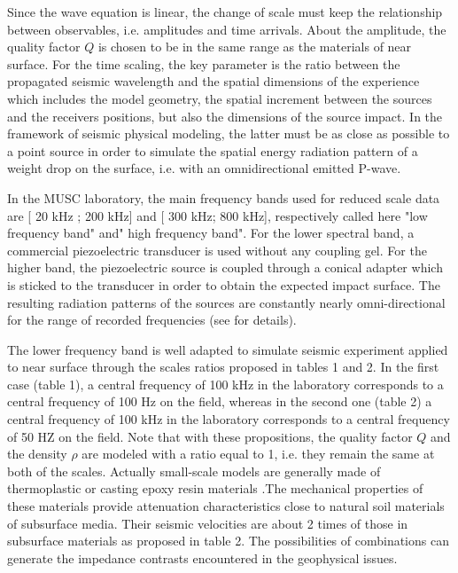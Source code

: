 \documentclass[manuscript,revised]{geophysics}
\begin{document}
\noindent Since the wave equation is linear, the change of scale must keep the relationship between observables, i.e. amplitudes and time arrivals. About the amplitude, the quality factor $Q$ is chosen to be in the same range as the materials of near surface. For the time scaling, the key parameter is the ratio between the propagated seismic wavelength and the spatial dimensions of the experience which includes the model geometry, the spatial increment between the sources and the receivers positions, but also the dimensions of the source impact. In the framework of seismic physical modeling, the latter must be as close as possible to a point source in order to simulate the spatial energy radiation pattern of a weight drop on the surface, i.e. with an omnidirectional emitted P-wave.

\noindent In the MUSC laboratory, the main frequency bands used for reduced scale data are [ 20 kHz ; 200 kHz] and [ 300 kHz; 800 kHz], respectively called here "low frequency band" and" high frequency band". For the lower spectral band, a commercial piezoelectric transducer is used without any coupling gel. For the higher band, the piezoelectric source is coupled through a conical adapter which is sticked to the transducer in order to obtain the expected impact surface. The resulting radiation patterns of the sources are constantly nearly omni-directional for the range of recorded frequencies (see \citet{Bretaudeau_SSM_2011} for details).

\noindent The lower frequency band is well adapted to simulate seismic experiment applied to near surface through the scales ratios proposed in tables 1 and 2. In the first case (table 1), a central frequency of 100 kHz in the laboratory corresponds to a central frequency of 100 Hz on the field, whereas in the second one (table 2) a central frequency of 100 kHz in the laboratory corresponds to a central frequency of 50 HZ on the field. Note that with these propositions, the  quality factor $Q$ and the density $\rho$ are modeled with a ratio equal to 1, i.e. they remain the same at both of the scales. Actually small-scale models are generally made of thermoplastic or casting epoxy resin materials \citep{Bretaudeau_FWI_2013}.The mechanical properties of these materials provide attenuation characteristics close to natural soil materials of subsurface media. Their seismic velocities are about 2 times of those in subsurface materials as proposed in table 2. The possibilities of combinations can generate the impedance contrasts encountered in the geophysical issues. 
\end{document}
